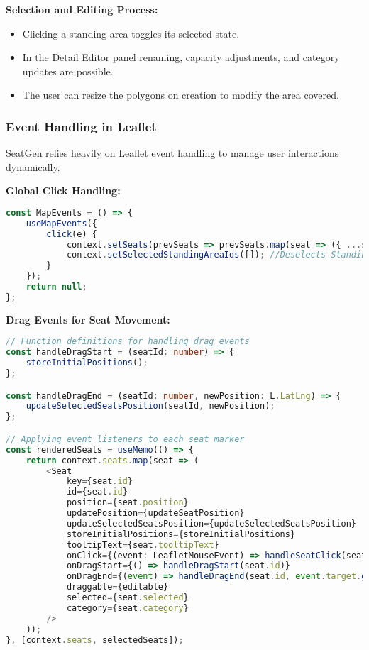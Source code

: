\textbf{Selection and Editing Process:}
\begin{itemize}
    \item Clicking a standing area toggles its selected state.
    \item In the Detail Editor panel renaming, capacity adjustments, and category updates are possible.
    \item The user can resize the polygons on creation to modify the area covered.
\end{itemize}

\subsubsection{Event Handling in Leaflet}

SeatGen relies heavily on Leaflet event handling to manage user interactions dynamically.

\textbf{Global Click Handling:}
\begin{lstlisting}[language=TypeScript, caption=Handling Global Click Events, label=lst:leaflet-global-click]
const MapEvents = () => {
    useMapEvents({
        click(e) {
            context.setSeats(prevSeats => prevSeats.map(seat => ({ ...seat, selected: false })));
            context.setSelectedStandingAreaIds([]); //Deselects Standing Areas because Seats are selected
        }
    });
    return null;
};
\end{lstlisting}

\textbf{Drag Events for Seat Movement:}
\begin{lstlisting}[language=TypeScript, caption=Handling Seat Drag Events, label=lst:leaflet-seat-drag]
// Function definitions for handling drag events
const handleDragStart = (seatId: number) => {
    storeInitialPositions();
};

const handleDragEnd = (seatId: number, newPosition: L.LatLng) => {
    updateSelectedSeatsPosition(seatId, newPosition);
};

// Applying event listeners to each seat marker
const renderedSeats = useMemo(() => {
    return context.seats.map(seat => (
        <Seat 
            key={seat.id} 
            id={seat.id}
            position={seat.position} 
            updatePosition={updateSeatPosition}
            updateSelectedSeatsPosition={updateSelectedSeatsPosition}
            storeInitialPositions={storeInitialPositions} 
            tooltipText={seat.tooltipText}
            onClick={(event: LeafletMouseEvent) => handleSeatClick(seat.id, event)}
            onDragStart={() => handleDragStart(seat.id)}
            onDragEnd={(event) => handleDragEnd(seat.id, event.target.getLatLng())}
            draggable={editable}
            selected={seat.selected}
            category={seat.category}
        />
    ));
}, [context.seats, selectedSeats]);
\end{lstlisting}

